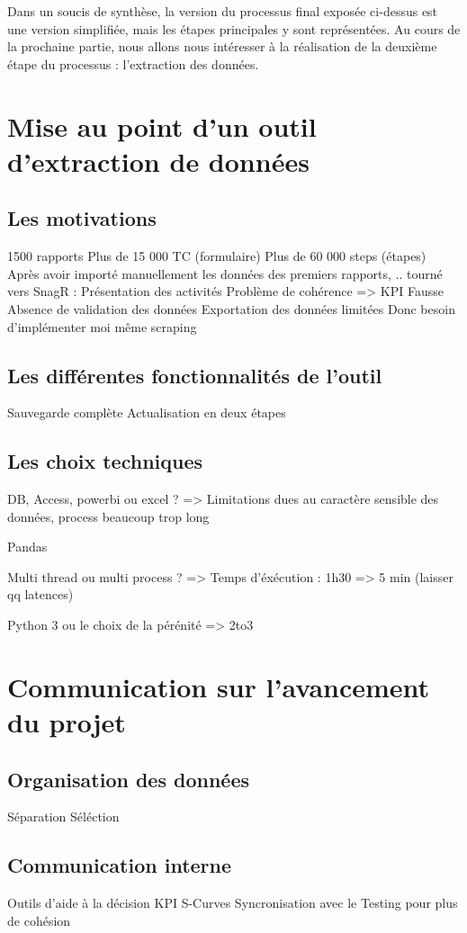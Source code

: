 Dans un soucis de synthèse, la version du processus final exposée ci-dessus est une version simplifiée, mais les étapes principales y sont représentées. 
Au cours de la prochaine partie, nous allons nous intéresser à la réalisation de la deuxième étape du processus : l'extraction des données. 

\section{Mise au point d'un outil d'extraction de données }

\subsection{Les motivations}
1500 rapports
Plus de 15 000 TC (formulaire)
Plus de 60 000 steps (étapes)
Après avoir importé manuellement les données des premiers rapports, .. tourné vers SnagR :
Présentation des activités
Problème de cohérence
=> KPI Fausse
Absence de validation des données
Exportation des données limitées
Donc besoin d'implémenter moi même
\gls{scraping}

\subsection{Les différentes fonctionnalités de l'outil}
Sauvegarde complète
Actualisation en deux étapes
\subsection{Les choix techniques}
DB, Access, powerbi ou excel ?
=> Limitations dues au caractère sensible des données, process beaucoup trop long

Pandas

Multi thread ou multi process ?
=> 
Temps d'éxécution : 1h30 => 5 min (laisser qq latences)

Python 3 ou le choix de la pérénité
=> 2to3

\section{Communication sur l'avancement du projet}
\subsection{Organisation des données}
Séparation
Séléction
\subsection{Communication interne}
Outils d'aide à la décision
KPI
S-Curves
Syncronisation avec le Testing pour plus de cohésion
